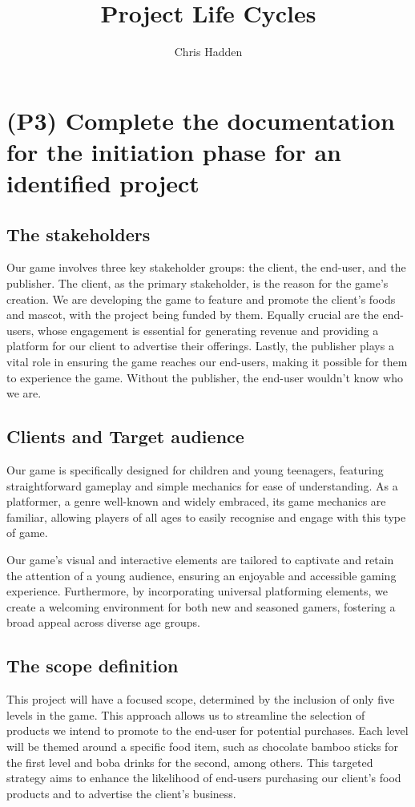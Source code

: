 \documentclass{article}
\title{Project Life Cycles}
\author{Chris Hadden}
\begin{document}
\maketitle

\tableofcontents

\section{(P3) Complete the documentation for the initiation phase for an identified project}

\subsection{The stakeholders}
Our game involves three key stakeholder groups: the client, the end-user, and the publisher. The client, as the primary stakeholder, is the reason for the game's creation. We are developing the game to feature and promote the client's foods and mascot, with the project being funded by them. Equally crucial are the end-users, whose engagement is essential for generating revenue and providing a platform for our client to advertise their offerings. Lastly, the publisher plays a vital role in ensuring the game reaches our end-users, making it possible for them to experience the game. Without the publisher, the end-user wouldn't know who we are.


\subsection{Clients and Target audience}
Our game is specifically designed for children and young teenagers, featuring straightforward gameplay and simple mechanics for ease of understanding. As a platformer, a genre well-known and widely embraced, its game mechanics are familiar, allowing players of all ages to easily recognise and engage with this type of game.

Our game's visual and interactive elements are tailored to captivate and retain the attention of a young audience, ensuring an enjoyable and accessible gaming experience. Furthermore, by incorporating universal platforming elements, we create a welcoming environment for both new and seasoned gamers, fostering a broad appeal across diverse age groups.

\subsection{The scope definition}
This project will have a focused scope, determined by the inclusion of only five levels in the game. This approach allows us to streamline the selection of products we intend to promote to the end-user for potential purchases. Each level will be themed around a specific food item, such as chocolate bamboo sticks for the first level and boba drinks for the second, among others. This targeted strategy aims to enhance the likelihood of end-users purchasing our client's food products and to advertise the client's business.
\end{document}
